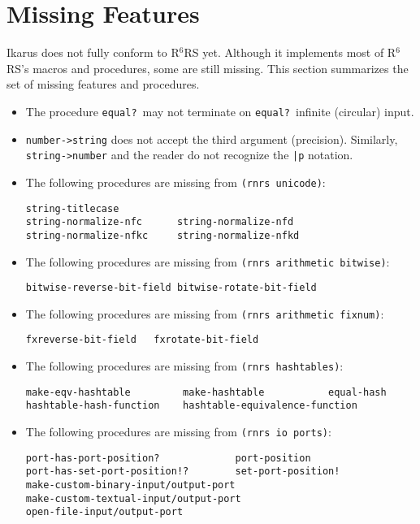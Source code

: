 \documentclass[onecolumn, 12pt, twoside, openright, dvipdfm]{book}
\newcommand{\rnrs}[1]{R$^{\mathrm{#1}}$RS}
\begin{document}
\chapter{Missing Features}

Ikarus does not fully conform to \rnrs{6} yet.  Although it
implements most of \rnrs{6}'s macros and procedures, some are still
missing.  This section summarizes the set of missing features and
procedures.


\begin{itemize}
\item The procedure \texttt{equal?}\ may not terminate on
\texttt{equal?}\ infinite (circular) input.
\item \texttt{number->string} does not accept the third argument
(precision).  Similarly, \texttt{string->number} and the reader do
not recognize the \texttt{|p} notation. 


\item The following procedures are missing from \texttt{(rnrs unicode)}:
\begin{Verbatim}
string-titlecase
string-normalize-nfc      string-normalize-nfd 
string-normalize-nfkc     string-normalize-nfkd   
\end{Verbatim}


\item The following procedures are missing from \texttt{(rnrs arithmetic
bitwise)}:
\begin{Verbatim}
bitwise-reverse-bit-field bitwise-rotate-bit-field 
\end{Verbatim}

\item The following procedures are missing from \texttt{(rnrs arithmetic
fixnum)}:
\begin{Verbatim}
fxreverse-bit-field   fxrotate-bit-field   
\end{Verbatim}


\item The following procedures are missing from \texttt{(rnrs hashtables)}:
\begin{Verbatim}
make-eqv-hashtable         make-hashtable           equal-hash
hashtable-hash-function    hashtable-equivalence-function 
\end{Verbatim}

\item The following procedures are missing from \texttt{(rnrs io ports)}:
\begin{Verbatim}
port-has-port-position?             port-position
port-has-set-port-position!?        set-port-position!
make-custom-binary-input/output-port    
make-custom-textual-input/output-port 
open-file-input/output-port
\end{Verbatim}

\end{itemize}



\nocite{ghuloum-implicit}
\nocite{ghuloum-generation}

\newpage
\backmatter
\appendix
{}


\newpage
{}
{}
\printindex
\end{document}
